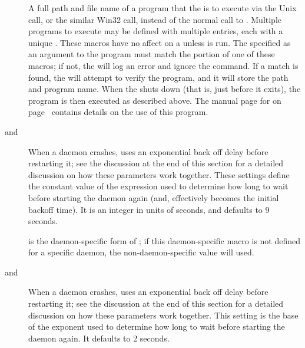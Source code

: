 \begin{description}
\label{param:MasterShutdownProgram}
\item[\Macro{MASTER\_SHUTDOWN\_$<$Name$>$}]
  A full path and file name of
  a program that the  is to execute
  via the Unix  call, 
  or the similar Win32  call,
  instead of the normal call to .
  Multiple programs to execute may be defined with multiple entries,
  each with a unique .
  These macros have no affect on a
   unless  is run.  
  The  specified as an argument to the 
  program must match the  portion of one of these
   macros; if not, the
   will log an error and ignore the command.  If a
  match is found, the  will attempt to verify the
  program, and it will store the path and program name.  When the
   shuts down (that is, just before it exits),
  the program is then executed as described above.
  The manual page for  on
  page~\pageref{man-condor-set-shutdown} contains details on the use
  of this program.

\label{param:MasterBackoffConstant}
\item[\Macro{MASTER\_BACKOFF\_CONSTANT} and
  \Macro{MASTER\_<name>\_BACKOFF\_CONSTANT}]
  When a daemon crashes,  uses an exponential back off
  delay before restarting it; see the discussion at the end of this
  section for a detailed discussion on how these parameters work together.
  These settings define the constant value of the expression used to
  determine how long to wait before starting the daemon again (and,
  effectively becomes the initial backoff time).  It is an integer in
  units of seconds, and defaults to 9 seconds.

   is the daemon-specific
  form of ; if this daemon-specific
  macro is not defined for a specific daemon, the non-daemon-specific
  value will used.

\label{param:MasterBackoffFactor}
\item[\Macro{MASTER\_BACKOFF\_FACTOR} and
      \Macro{MASTER\_<name>\_BACKOFF\_FACTOR}]
  When a daemon crashes,  uses an exponential back off
  delay before restarting it; see the discussion at the end of this
  section for a detailed discussion on how these parameters work together.
  This setting is the base of the
  exponent used to determine how long to wait before starting the
  daemon again.  It defaults to 2 seconds.


\end{description}
